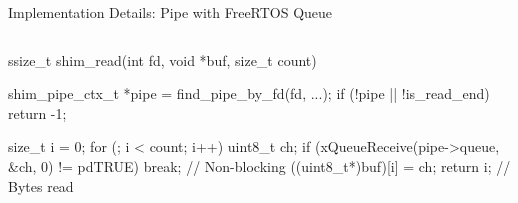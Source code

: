 \documentclass[aspectratio=169, 10pt]{beamer}
\begin{document}
\begin{frame}{Implementation Details: Pipe with FreeRTOS Queue}
\begin{columns}[T]
        \vspace{0.2cm}
        \begin{ccode}
ssize_t shim_read(int fd, void *buf, size_t count) {
    shim_pipe_ctx_t *pipe = find_pipe_by_fd(fd, ...);
    if (!pipe || !is_read_end) return -1;
    
    size_t i = 0;
    for (; i < count; i++) {
        uint8_t ch;
        if (xQueueReceive(pipe->queue, &ch, 0) != pdTRUE)
            break;  // Non-blocking
        ((uint8_t*)buf)[i] = ch;
    }
    return i;  // Bytes read
}
        \end{ccode}
    \end{columns}
\end{frame}

\end{document}
